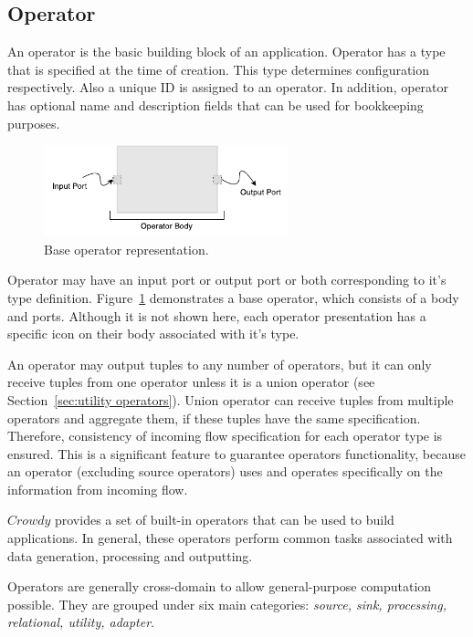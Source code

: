 \subsection{Operator}
\label{sec:operator}
An operator is the basic building block of an application. Operator has a type that is 
specified at the time of creation. This type determines configuration respectively. Also a 
unique ID is assigned to an operator. In addition, operator has optional name and 
description fields that can be used for bookkeeping purposes.

\begin{figure}[ht]
	\centering
	\includegraphics[height=100px]{figures/basicoperator.pdf}
	\caption{Base operator representation.}
	\label{fig:basic operator}
\end{figure}

Operator may have an input port or output port or both corresponding to it's type 
definition. Figure~\ref{fig:basic operator} demonstrates a base operator, which 
consists of a body and ports. Although it is not shown here, each operator presentation 
has a specific icon on their body associated with it's type.

An operator may output tuples to any number of operators, but it can only receive 
tuples from one operator unless it is a union operator (see Section~\ref{sec:utility operators}). 
Union operator can receive tuples from multiple operators and aggregate them,
if these tuples have the same specification. Therefore, consistency of incoming flow 
specification for each operator type is ensured. 
This is a significant feature to guarantee operators functionality, because an operator 
(excluding source operators) uses and operates specifically on the 
information from incoming flow.

$Crowdy$ provides a set of built-in operators that can be used to build applications. 
In general, these operators perform common tasks associated with data generation, 
processing and outputting.

Operators are generally cross-domain to allow general-purpose 
computation possible. They are grouped under six main categories: 
\textit{source, sink, processing, relational, utility, adapter}.

